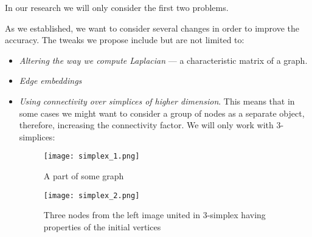 In our research we will only consider the first two problems.

As we established, we want to consider several changes in order to improve the accuracy.
The tweaks we propose include but are not limited to:
\begin{itemize}
	\item \textit{Altering the way we compute Laplacian} --- a characteristic matrix of a graph.
	\item \textit{Edge embeddings}
	\item \textit{Using connectivity over simplices of higher dimension}. This means that in some cases we might want to consider a group of nodes as a separate object, therefore, increasing the connectivity factor. We will only work with 3-simplices:
	      \begin{figure}[h]
		      \begin{multicols}{2}
			      \centering
			      \texttt{[image: simplex\_1.png]}
			      \caption{A part of some graph}\label{fig:clique_merged}

			      \centering
			      \texttt{[image: simplex\_2.png]}
			      \caption{Three nodes from the left image united in 3-simplex having properties of the initial vertices}
		      \end{multicols}
	      \end{figure}
\end{itemize}

